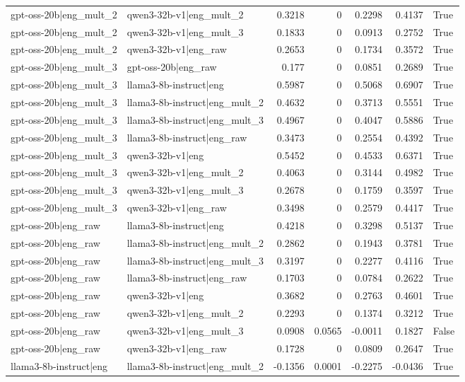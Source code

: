 \begin{table}
\begin{tabular}{l l r r r r l}
gpt-oss-20b|eng_mult_2 & qwen3-32b-v1|eng_mult_2 & 0.3218 & 0 & 0.2298 & 0.4137 & True \\
gpt-oss-20b|eng_mult_2 & qwen3-32b-v1|eng_mult_3 & 0.1833 & 0 & 0.0913 & 0.2752 & True \\
gpt-oss-20b|eng_mult_2 & qwen3-32b-v1|eng_raw & 0.2653 & 0 & 0.1734 & 0.3572 & True \\
gpt-oss-20b|eng_mult_3 & gpt-oss-20b|eng_raw & 0.177 & 0 & 0.0851 & 0.2689 & True \\
gpt-oss-20b|eng_mult_3 & llama3-8b-instruct|eng & 0.5987 & 0 & 0.5068 & 0.6907 & True \\
gpt-oss-20b|eng_mult_3 & llama3-8b-instruct|eng_mult_2 & 0.4632 & 0 & 0.3713 & 0.5551 & True \\
gpt-oss-20b|eng_mult_3 & llama3-8b-instruct|eng_mult_3 & 0.4967 & 0 & 0.4047 & 0.5886 & True \\
gpt-oss-20b|eng_mult_3 & llama3-8b-instruct|eng_raw & 0.3473 & 0 & 0.2554 & 0.4392 & True \\
gpt-oss-20b|eng_mult_3 & qwen3-32b-v1|eng & 0.5452 & 0 & 0.4533 & 0.6371 & True \\
gpt-oss-20b|eng_mult_3 & qwen3-32b-v1|eng_mult_2 & 0.4063 & 0 & 0.3144 & 0.4982 & True \\
gpt-oss-20b|eng_mult_3 & qwen3-32b-v1|eng_mult_3 & 0.2678 & 0 & 0.1759 & 0.3597 & True \\
gpt-oss-20b|eng_mult_3 & qwen3-32b-v1|eng_raw & 0.3498 & 0 & 0.2579 & 0.4417 & True \\
gpt-oss-20b|eng_raw & llama3-8b-instruct|eng & 0.4218 & 0 & 0.3298 & 0.5137 & True \\
gpt-oss-20b|eng_raw & llama3-8b-instruct|eng_mult_2 & 0.2862 & 0 & 0.1943 & 0.3781 & True \\
gpt-oss-20b|eng_raw & llama3-8b-instruct|eng_mult_3 & 0.3197 & 0 & 0.2277 & 0.4116 & True \\
gpt-oss-20b|eng_raw & llama3-8b-instruct|eng_raw & 0.1703 & 0 & 0.0784 & 0.2622 & True \\
gpt-oss-20b|eng_raw & qwen3-32b-v1|eng & 0.3682 & 0 & 0.2763 & 0.4601 & True \\
gpt-oss-20b|eng_raw & qwen3-32b-v1|eng_mult_2 & 0.2293 & 0 & 0.1374 & 0.3212 & True \\
gpt-oss-20b|eng_raw & qwen3-32b-v1|eng_mult_3 & 0.0908 & 0.0565 & -0.0011 & 0.1827 & False \\
gpt-oss-20b|eng_raw & qwen3-32b-v1|eng_raw & 0.1728 & 0 & 0.0809 & 0.2647 & True \\
llama3-8b-instruct|eng & llama3-8b-instruct|eng_mult_2 & -0.1356 & 0.0001 & -0.2275 & -0.0436 & True \\

\end{tabular}
\end{table}
